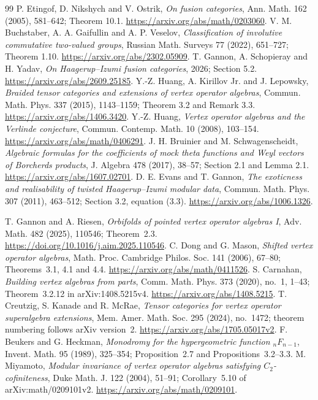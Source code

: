 \documentclass[11pt]{article}
\numberwithin{equation}{section}
\begin{document}
\begin{thebibliography}{99}
 P. Etingof, D. Nikshych and V. Ostrik, \emph{On fusion categories}, Ann. Math. 162 (2005), 581--642; Theorem 10.1. \url{https://arxiv.org/abs/math/0203060}.
 V. M. Buchstaber, A. A. Gaifullin and A. P. Veselov, \emph{Classification of involutive commutative two-valued groups}, Russian Math. Surveys 77 (2022), 651--727; Theorem 1.10. \url{https://arxiv.org/abs/2302.05909}.
 T. Gannon, A. Schopieray and H. Yadav, \emph{On Haagerup--Izumi fusion categories}, 2026; Section 5.2. \url{https://arxiv.org/abs/2609.25185}.
 Y.-Z. Huang, A. Kirillov Jr. and J. Lepowsky, \emph{Braided tensor categories and extensions of vertex operator algebras}, Commun. Math. Phys. 337 (2015), 1143--1159; Theorem 3.2 and Remark 3.3. \url{https://arxiv.org/abs/1406.3420}.
 Y.-Z. Huang, \emph{Vertex operator algebras and the Verlinde conjecture}, Commun. Contemp. Math. 10 (2008), 103--154. \url{https://arxiv.org/abs/math/0406291}.
 J. H. Bruinier and M. Schwagenscheidt, \emph{Algebraic formulas for the coefficients of mock theta functions and Weyl vectors of Borcherds products}, J. Algebra 478 (2017), 38--57; Section 2.1 and Lemma 2.1. \url{https://arxiv.org/abs/1607.02701}.
 D. E. Evans and T. Gannon, \emph{The exoticness and realisability of twisted Haagerup--Izumi modular data}, Commun. Math. Phys. 307 (2011), 463--512; Section 3.2, equation (3.3). \url{https://arxiv.org/abs/1006.1326}.

 T. Gannon and A. Riesen, \emph{Orbifolds of pointed vertex operator algebras I}, Adv. Math. 482 (2025), 110546; Theorem~2.3. \url{https://doi.org/10.1016/j.aim.2025.110546}.
 C. Dong and G. Mason, \emph{Shifted vertex operator algebras}, Math. Proc. Cambridge Philos. Soc. 141 (2006), 67--80; Theorems~3.1, 4.1 and 4.4. \url{https://arxiv.org/abs/math/0411526}.
 S. Carnahan, \emph{Building vertex algebras from parts}, Comm. Math. Phys. 373 (2020), no.~1, 1--43; Theorem~3.2.12 in arXiv:1408.5215v4. \url{https://arxiv.org/abs/1408.5215}.
 T. Creutzig, S. Kanade and R. McRae, \emph{Tensor categories for vertex operator superalgebra extensions}, Mem. Amer. Math. Soc. 295 (2024), no.~1472; theorem numbering follows arXiv version~2. \url{https://arxiv.org/abs/1705.05017v2}.
 F. Beukers and G. Heckman, \emph{Monodromy for the hypergeometric function ${}_nF_{n-1}$}, Invent. Math. 95 (1989), 325--354; Proposition~2.7 and Propositions~3.2--3.3.
 M. Miyamoto, \emph{Modular invariance of vertex operator algebras satisfying $C_2$-cofiniteness}, Duke Math. J. 122 (2004), 51--91; Corollary~5.10 of arXiv:math/0209101v2. \url{https://arxiv.org/abs/math/0209101}.
\end{thebibliography}
\end{document}
